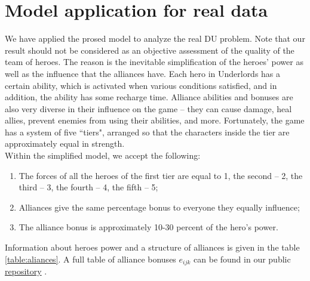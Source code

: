 \documentclass[smallextended]{svjour3}       %
\begin{document}
\section{Model application for real data}
\label{SectionComputationalResults}
We have applied the prosed model to analyze the real DU problem. Note that our result should not be considered as an objective assessment of the quality of the team of heroes. The reason is the inevitable simplification of the heroes’ power as well as the influence that the alliances have. Each hero in Underlords has a certain ability, which is activated when various conditions satisfied, and in addition, the ability has some recharge time. Alliance abilities and bonuses are also very diverse in their influence on the game -- they can cause damage, heal allies, prevent enemies from using their abilities, and more. Fortunately, the game has a system of five ``tiers", arranged so that the characters inside the tier are approximately equal in strength.\\
Within the simplified model, we accept the following:
\begin{enumerate}
\item The forces of all the heroes of the first tier are equal to 1,  the second -- 2, the third -- 3, the fourth -- 4, the fifth -- 5;
\item Alliances give the same percentage bonus to everyone they equally influence;
\item The alliance bonus is approximately 10-30 percent of the hero’s power.
\end{enumerate}

Information about heroes power and a structure of alliances is given in the table \ref{table:aliances}.
A full table of alliance bonuses  $e_{ijk} $ can be found in our public \href{https://github.com/aponom84/UnderLords/blob/master/UnderLordsData.xlsx}{repository} \cite{UnderLordsInput}.
\end{document}
